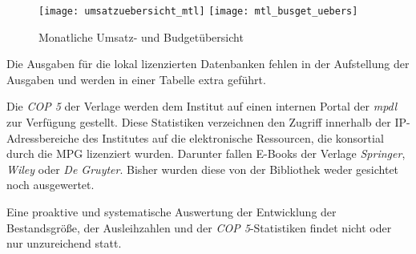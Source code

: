 \begin{figure}[h]
    \centering
        \texttt{[image: umsatzuebersicht\_mtl]}
        \texttt{[image: mtl\_busget\_uebers]}
        \caption{Monatliche Umsatz- und Budgetübersicht}
        \label{fig:budget- und umsatzuebersicht}
\end{figure}

Die Ausgaben für die lokal lizenzierten Datenbanken fehlen in der Aufstellung der Ausgaben und werden in einer Tabelle extra geführt.

Die \textit{\acrfull{COP 5}} der Verlage werden dem Institut auf einen internen Portal der \textit{\acrshort{mpdl}} zur Verfügung gestellt.
Diese Statistiken verzeichnen den Zugriff innerhalb der IP-Adressbereiche des Institutes auf die elektronische Ressourcen, 
die konsortial durch die \acrshort{MPG} lizenziert wurden. Darunter fallen E-Books der Verlage 
\textit{Springer}, \textit{Wiley} oder \textit{De Gruyter}. Bisher wurden diese von der Bibliothek weder gesichtet noch ausgewertet.

Eine proaktive und systematische Auswertung der Entwicklung der Bestandsgröße, der Ausleihzahlen und der \textit{\acrshort{COP 5}}-Statistiken findet nicht
oder nur unzureichend statt. 


